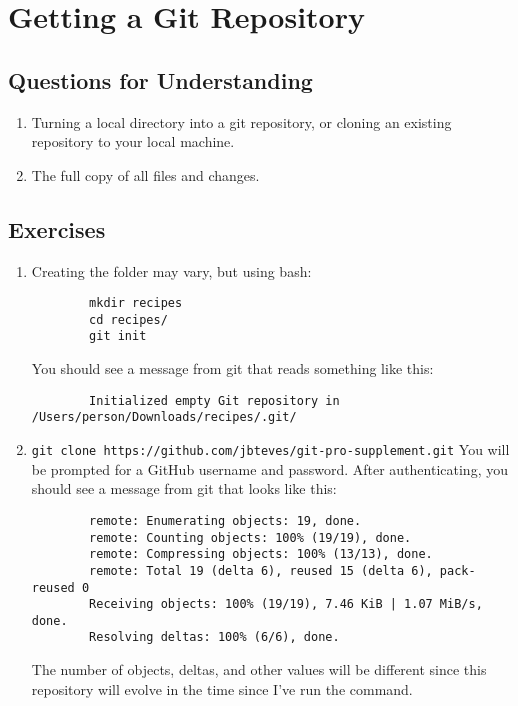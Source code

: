 \section{Getting a Git Repository}

\subsection{Questions for Understanding}
\begin{enumerate}
    \item Turning a local directory into a git repository, or cloning an
        existing repository to your local machine.
    \item The full copy of all files and changes.
\end{enumerate}

\subsection{Exercises}
\begin{enumerate}
    \item Creating the folder may vary, but using bash:
        \begin{verbatim}
        mkdir recipes
        cd recipes/
        git init
        \end{verbatim}
        You should see a message from git that reads something like this:
        \begin{verbatim}
        Initialized empty Git repository in /Users/person/Downloads/recipes/.git/
        \end{verbatim}
    \item \verb+git clone https://github.com/jbteves/git-pro-supplement.git+
        You will be prompted for a GitHub username and password.
        After authenticating, you should see a message from git that looks
        like this:
        \begin{verbatim}
        remote: Enumerating objects: 19, done.
        remote: Counting objects: 100% (19/19), done.
        remote: Compressing objects: 100% (13/13), done.
        remote: Total 19 (delta 6), reused 15 (delta 6), pack-reused 0
        Receiving objects: 100% (19/19), 7.46 KiB | 1.07 MiB/s, done.
        Resolving deltas: 100% (6/6), done.
        \end{verbatim}
        The number of objects, deltas, and other values will be different
        since this repository will evolve in the time since I've run the
        command.
\end{enumerate}


